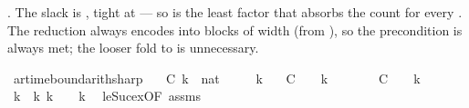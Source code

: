 \begin{isabellebody}
\begin{isamarkuptext}
  .  The slack is , tight at
   --- so  is the least factor that absorbs the count
  for every .  The reduction always encodes into blocks of width
   (from ), so the  precondition is always
  met; the looser  fold to  is unnecessary.%
\end{isamarkuptext}\isamarkuptrue%
\isamarkupfalse%
\ ar{\isacharunderscore}{\kern0pt}time{\isacharunderscore}{\kern0pt}bound{\isacharunderscore}{\kern0pt}arith{\isacharunderscore}{\kern0pt}sharp{\isacharcolon}{\kern0pt}\isanewline
\ \ \ C\ k\ {\isacharcolon}{\kern0pt}{\isacharcolon}{\kern0pt}\ nat\isanewline
\ \ \ {\isachardoublequoteopen}{}\ {\isasymle}\ k{\isachardoublequoteclose}\isanewline
\ \ \ {\isachardoublequoteopen}C\ {\isacharasterisk}{\kern0pt}\ {\isacharparenleft}{\kern0pt}{}\ {\isacharasterisk}{\kern0pt}\ k\ {\isacharplus}{\kern0pt}\ {}{\isacharparenright}{\kern0pt}\ {\isacharplus}{\kern0pt}\ {}\ {\isasymle}\ {\isacharparenleft}{\kern0pt}{}\ {\isacharasterisk}{\kern0pt}\ C\ {\isacharplus}{\kern0pt}\ {}{\isacharparenright}{\kern0pt}\ {\isacharasterisk}{\kern0pt}\ k{\isachardoublequoteclose}\isanewline
%
\isadelimproof
%
\endisadelimproof
%
\isatagproof
{}\isamarkupfalse%
\ {\isacharminus}{\kern0pt}\isanewline
\ \ \isamarkupfalse%
\ k{}\ \ k{\isacharcolon}{\kern0pt}\ {\isachardoublequoteopen}k\ {\isacharequal}{\kern0pt}\ {}\ {\isacharplus}{\kern0pt}\ k{}{\isachardoublequoteclose}\ \isamarkupfalse%
\ le{\isacharunderscore}{\kern0pt}Suc{\isacharunderscore}{\kern0pt}ex{\isacharbrackleft}{\kern0pt}OF\ assms{\isacharbrackright}{\kern0pt}\ \isamarkupfalse%

\end{isabellebody}

